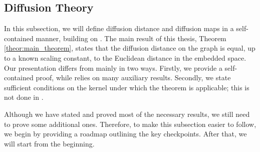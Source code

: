 \subsection{Diffusion Theory}\label{subsec:diff_theory}
In this subsection, we will define diffusion distance and diffusion maps in a self-contained manner, building on \cite{nips:dif_maps}. The main result of this thesis, Theorem \ref{theor:main_theorem}, states that the diffusion distance on the graph is equal, up to a known scaling constant, to the Euclidean distance in the embedded space. Our presentation differs from \cite{nips:dif_maps} mainly in two ways. Firstly, we provide a self-contained proof, while \cite{nips:dif_maps} relies on many auxiliary results. Secondly, we state sufficient conditions on the kernel under which the theorem is applicable; this is not done in \cite{nips:dif_maps}.


Although we have stated and proved most of the necessary results, we still need to prove some additional ones. Therefore, to make this subsection easier to follow, we begin by providing a roadmap outlining the key checkpoints. After that, we will start from the beginning.

